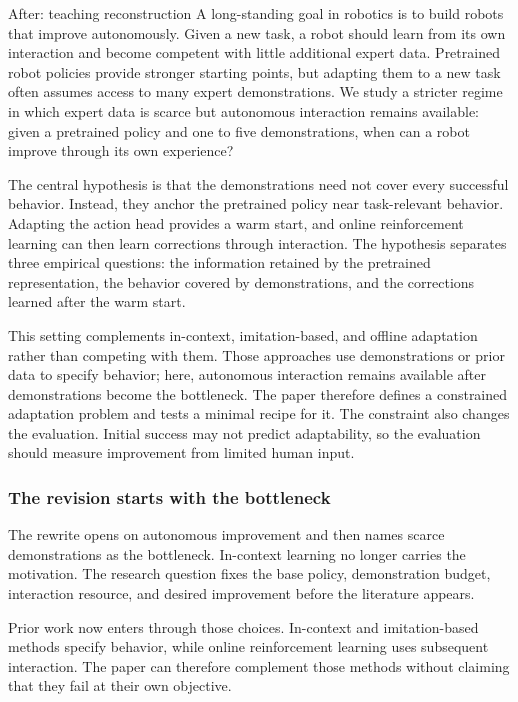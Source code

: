 \begin{AIbox}[breakable]{After: teaching reconstruction}
A long-standing goal in robotics is to build robots that improve autonomously.
Given a new task, a robot should learn from its own interaction and become
competent with little additional expert data. Pretrained robot policies provide
stronger starting points, but adapting them to a new task often assumes access
to many expert demonstrations. We study a stricter regime in which expert data
is scarce but autonomous interaction remains available: given a pretrained
policy and one to five demonstrations, when can a robot improve through its own
experience?

The central hypothesis is that the demonstrations need not cover every
successful behavior. Instead, they anchor the pretrained policy near
task-relevant behavior. Adapting the action head provides a warm start, and
online reinforcement learning can then learn corrections through interaction.
The hypothesis separates three empirical questions: the information retained
by the pretrained representation, the behavior covered by demonstrations, and
the corrections learned after the warm start.

This setting complements in-context, imitation-based, and offline adaptation
rather than competing with them. Those approaches use demonstrations or prior
data to specify behavior; here, autonomous interaction remains available after
demonstrations become the bottleneck. The paper therefore defines a constrained
adaptation problem and tests a minimal recipe for it. The constraint also
changes the evaluation. Initial success may not predict adaptability, so the
evaluation should measure improvement from limited human input.
\end{AIbox}

\subsubsection*{The revision starts with the bottleneck}

The rewrite opens on autonomous improvement and then names scarce
demonstrations as the bottleneck. In-context learning no longer carries the
motivation. The research question fixes the base policy, demonstration budget,
interaction resource, and desired improvement before the literature appears.

Prior work now enters through those choices. In-context and imitation-based
methods specify behavior, while online reinforcement learning uses subsequent
interaction. The paper can therefore complement those methods without claiming
that they fail at their own objective.

